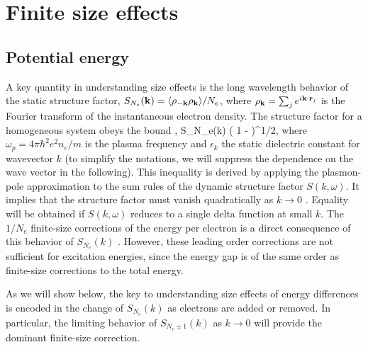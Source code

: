 \section{Finite size effects\label{sec:bg-fse}}

\subsection{Potential energy}

A key quantity in understanding size effects is the long wavelength behavior of the static structure factor,
$S_{N_e}({\bf k})=\langle \rho_{-{\bf k}} \rho_{{\bf k}} \rangle/N_e$, where $\rho_{\bf k}=\sum_j e^{i {\bf k} \cdot {\bf r}_j}$ is the Fourier transform of the instantaneous electron density.
The structure factor for a homogeneous system obeys the bound \cite{Ceperley87,book},
\beq
S_{N_e}(k) \le {}\left( 1 -  \right)^{1/2},
\label{davidbound}
\eeq
where $\omega_p=4 \pi \hbar^2 e^2 n_e/m$ is the plasma frequency and $\epsilon_k$ the static dielectric constant for wavevector $k$ (to simplify the notations, we will suppress the dependence on the wave vector in the following). This inequality is derived by applying the plasmon-pole approximation to the sum rules of the dynamic structure factor $S(k, \omega)$. It implies that the structure factor must vanish quadratically as
$k \rightarrow 0$ \cite{Nozieres}.
Equality will be obtained if $S(k,\omega)$ reduces to a single delta function at small $k$.
The $1/N_e$ finite-size corrections of the energy per electron is a direct consequence of
this behavior of $S_{N_e}(k)$ \cite{fse}. However, these leading order corrections are not sufficient for excitation energies, since the energy gap is of the same order as finite-size corrections to the total energy.

As we will show below, the key to understanding size effects of energy differences is encoded in the change of $S_{N_e}(k)$ as electrons are added or removed. In particular, the limiting behavior of $S_{N_e\pm 1}(k)$ as $k\rightarrow0$ will provide the dominant finite-size correction.

